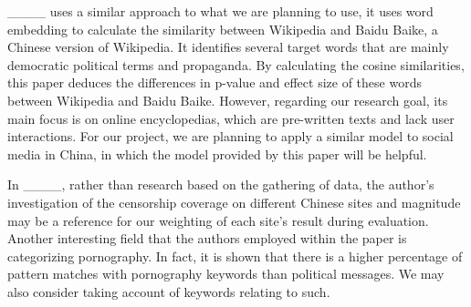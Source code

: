 ____ uses a similar approach to what we are planning to use, it uses word embedding to calculate the similarity between Wikipedia and Baidu Baike, a Chinese version of Wikipedia. It identifies several target words that are mainly democratic political terms and propaganda. By calculating the cosine similarities, this paper deduces the differences in p-value and effect size of these words between Wikipedia and Baidu Baike. However, regarding our research goal, its main focus is on online encyclopedias, which are pre-written texts and lack user interactions. For our project, we are planning to apply a similar model to social media in China, in which the model provided by this paper will be helpful.

In ____, rather than research based on the gathering of data, the author’s investigation of the censorship coverage on different Chinese sites and magnitude may be a reference for our weighting of each site’s result during evaluation. Another interesting field that the authors employed within the paper is categorizing pornography. In fact, it is shown that there is a higher percentage of pattern matches with pornography keywords than political messages. We may also consider taking account of keywords relating to such.